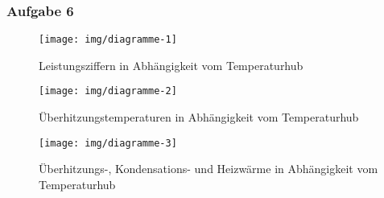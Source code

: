 \subsubsection*{Aufgabe 6}

\begin{figure}[h!]
	\centering
	\texttt{[image: img/diagramme-1]}
	\caption{Leistungsziffern in Abhängigkeit vom Temperaturhub}
	\label{dia:lz_t}
\end{figure}
\FloatBarrier
\begin{figure}[h!]
	\centering
	\texttt{[image: img/diagramme-2]}
	\caption{Überhitzungstemperaturen in Abhängigkeit vom Temperaturhub}
	\label{dia:tu_t}
\end{figure}
\FloatBarrier
\begin{figure}[h!]
	\centering
	\texttt{[image: img/diagramme-3]}
	\caption{Überhitzungs-, Kondensations- und Heizwärme in Abhängigkeit vom Temperaturhub}
	\label{dia:q_t}
\end{figure}
\FloatBarrier

